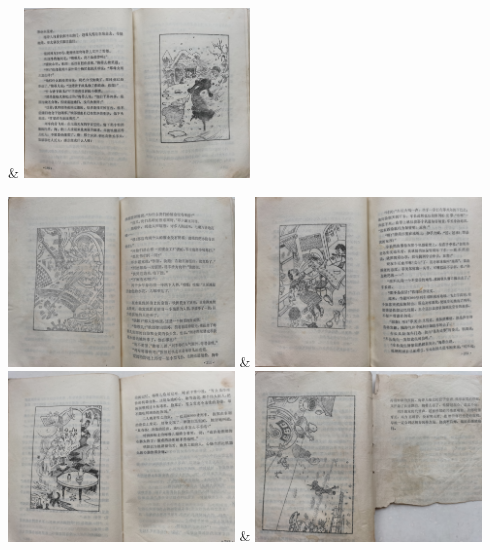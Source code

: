 \begin{tblr}{}
      & \includegraphics[width=6cm]{pic/银河列车-6.jpg}
  \end{tblr}

  \begin{tblr}{}
    \includegraphics[width=6cm]{pic/银河列车-7.jpg}
      & \includegraphics[width=6cm]{pic/银河列车-8.jpg} \\
    \includegraphics[width=6cm]{pic/银河列车-9.jpg}
    & \includegraphics[width=6cm]{pic/银河列车-a.jpg}
  \end{tblr}

